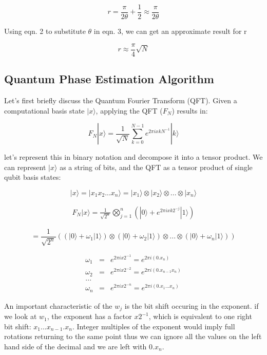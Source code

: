 \documentclass[twocolumn,showpacs,preprintnumbers,amsmath,amssymb]{revtex4}
\begin{document}
		\begin{equation}
			r = \frac{\pi}{2\theta} + \frac{1}{2} \approx \frac{\pi}{2\theta}
		\end{equation}
		
		Using eqn. 2 to substitute $\theta$ in eqn. 3, we can get an approximate result for r
		
		\begin{equation}
			r \approx \frac{\pi}{4}\sqrt{N}
		\end{equation}
		
		
		\subsection{Quantum Phase Estimation Algorithm}
		
		Let's first briefly discuss the Quantum Fourier Transform (QFT). Given a computational basis state $|x\rangle$, applying the QFT ($F_N$) results in:
		
		$$ F_N |x \rangle = \frac{1}{\sqrt{N}} \sum_{k=0}^{N-1} e^{2\pi i x k N^{-1}} |k\rangle $$
		
		let's represent this in binary notation and decompose it into a tensor product. We can represent $|x\rangle$ as a string of bits, and the QFT as a tensor product of single qubit basis states:
				
		$$|x\rangle = |x_1x_2 ... x_n\rangle =  |x_1\rangle \otimes |x_2\rangle \otimes ... \otimes |x_n\rangle$$
		
		\begin{eqnarray}
		F_N |x \rangle = \frac{1}{\sqrt{2^n}} \bigotimes_{j=1}^n (|0\rangle +  e^{2\pi i x k 2^{-j}} |1\rangle)
		\end{eqnarray}
		
		$$= \frac{1}{\sqrt{2^n}} ((|0\rangle + \omega_1|1\rangle)  \otimes(|0\rangle + \omega_2|1\rangle)\otimes ... \otimes(|0\rangle + \omega_n|1\rangle))$$
	    
	     
		\begin{eqnarray*}
		\omega_1 &=& e^{2\pi i x 2^{-1}} =  e^{2\pi i (0.x_n)}\\
		\omega_2 &=& e^{2\pi i x 2^{-2}} =  e^{2\pi i (0.x_{n-1}x_n)}\\
		...\\
		\omega_n &=& e^{2\pi i x 2^{-n}} =  e^{2\pi i (0.x_1...x_n)}
		\end{eqnarray*}
	    
		
		An important characteristic of the $w_j$ is the bit shift occuring in the exponent. if we look at $w_1$, the exponent has a factor $x 2^{-1}$, which is equivalent to one right bit shift: $x_1...x_{n-1}.x_n$. Integer multiples of the exponent would imply full rotations returning to the same point thus we can ignore all the values on the left hand side of the decimal and we are left with $0.x_n$. 
		
\end{document}
